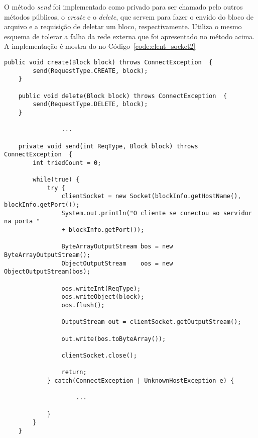 O método \textit{send} foi implementado como privado para ser chamado pelo outros métodos públicos, o \textit{create} e o \textit{delete}, que servem para fazer o envido do bloco de arquivo e a requisição de deletar um bloco, respectivamente.
Utiliza o mesmo esquema de tolerar a falha da rede externa que foi apresentado no método acima.
A implementação é mostra do no Código~\ref{code:clent_socket2}
\begin{lstlisting}[basicstyle=\ttfamily\footnotesize, frame=single, caption=Exemplo de métodos da classe ClientServerSocket, label=code:clent_socket2]	
	public void create(Block block) throws ConnectException  {
		send(RequestType.CREATE, block);
	}
	
	public void delete(Block block) throws ConnectException  {
		send(RequestType.DELETE, block);
	}
	
				...
	
	private void send(int ReqType, Block block) throws ConnectException  {
		int triedCount = 0;
		
		while(true) {
			try {
				clientSocket = new Socket(blockInfo.getHostName(), blockInfo.getPort());
				System.out.println("O cliente se conectou ao servidor na porta " 
				+ blockInfo.getPort());
				
				ByteArrayOutputStream bos = new ByteArrayOutputStream();
				ObjectOutputStream    oos = new ObjectOutputStream(bos);
				
				oos.writeInt(ReqType);
				oos.writeObject(block);
				oos.flush();
				
				OutputStream out = clientSocket.getOutputStream();
				
				out.write(bos.toByteArray());
				
				clientSocket.close();
				
				return;
			} catch(ConnectException | UnknownHostException e) {
			
					...
					
			}
		}
	}
\end{lstlisting}

